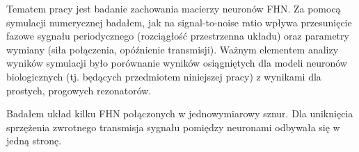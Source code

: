   Tematem pracy jest badanie zachowania macierzy neuronów FHN. Za pomocą symulacji numerycznej badałem, jak na signal-to-noise ratio wpływa przesunięcie fazowe sygnału periodycznego (rozciągłość przestrzenna układu) oraz parametry wymiany (siła połączenia, opóźnienie transmisji). Ważnym elementem analizy wyników symulacji było porównanie wyników osiągniętych dla modeli neuronów biologicznych (tj. będących przedmiotem niniejszej pracy) z wynikami dla prostych, progowych rezonatorów.

  Badałem układ kilku FHN połączonych w jednowymiarowy sznur. Dla uniknięcia sprzężenia zwrotnego  transmisja sygnału pomiędzy neuronami odbywała się w jedną stronę.
